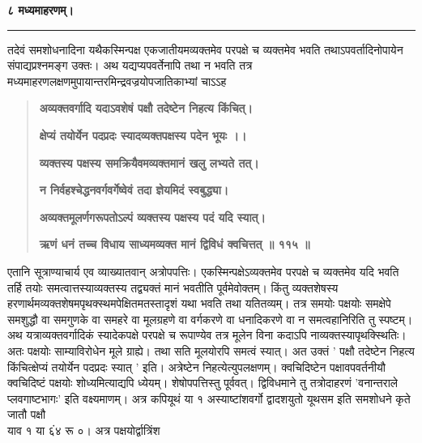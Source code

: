 \documentclass[11pt, openany]{book}
\begin{document}
\onehalfspacing
\begin{center}
\textbf{\large ८ मध्यमाहरणम्।}

\rule{0.1\linewidth}{0.5pt}
\end{center}

\begin{sloppypar}
\hangindent=0.2in \hspace{0.2in}तदेवं समशोधनादिना यथैकस्मिन्पक्ष एकजातीयमव्यक्तमेव परपक्षे च व्यक्तमेव भवति तथाऽपवर्तादिनोपायेन संपाद्यप्रश्नमङ्ग उक्तः। अथ यद्यप्यपवर्तेनापि तथा न भवति तत्र मध्यमाहरणलक्षणमुपायान्तरमिन्द्रवज्रयोपजातिकाभ्यां चाऽऽह\textendash

\begin{quote}
\hspace{0.5in}\textbf{अव्यक्तवर्गादि यदाऽवशेषं पक्षौ तदेष्टेन निहत्य किंचित्।}

\hspace{0.5in}\textbf{क्षेप्यं तयोर्येन पदप्रदः स्यादव्यक्तपक्षस्य पदेन भूयः ।।}

\hspace{0.5in}\textbf{व्यक्तस्य पक्षस्य समक्रियैवमव्यक्तमानं खलु लभ्यते तत्।}

\hspace{0.5in}\textbf{न निर्वहश्चेद्धनवर्गवर्गेष्वेवं तदा ज्ञेयमिदं स्वबुद्ध्या।}

\hspace{0.5in}\textbf{अव्यक्तमूलर्णगरूपतोऽल्पं व्यक्तस्य पक्षस्य पदं यदि स्यात्।}

\hspace{0.5in}\textbf{ऋणं धनं तच्च विधाय साध्यमव्यक्त मानं द्विविधं क्वचित्तत् ॥ ११५ ॥}
\end{quote}

\hangindent=0.2in \hspace{0.2in}एतानि सूत्राण्याचार्य एव व्याख्यातवान् अत्रोपपत्तिः। एकस्मिन्पक्षेऽव्यक्तमेव परपक्षे च व्यक्तमेव यदि भवति तर्हि तयोः समत्वात्तस्याव्यक्तस्य तद्व्यक्तं मानं भवतीति पूर्वमेवोक्तम्। किंतु व्यक्तशेषस्य हरणार्थमव्यक्तशेषमपृथक्स्थमपेक्षितमतस्तादृशं यथा भवति तथा यतितव्यम्। तत्र समयोः पक्षयोः समक्षेपे समशुद्धौ वा समगुणके वा समहरे वा मूलग्रहणे वा वर्गकरणे वा धनादिकरणे वा न समत्वहानिरिति तु स्पष्टम्। अथ यत्राव्यक्तवर्गादिकं स्यादेकपक्षे परपक्षे च रूपाण्येव तत्र मूलेन विना कदाऽपि नाव्यक्तस्यापृथक्स्थितिः। अतः पक्षयोः साम्याविरोधेन मूले ग्राह्ये। तथा सति मूलयोरपि समत्वं स्यात्। अत उक्तं ' पक्षौ तदेष्टेन निहत्य किंचित्क्षेप्यं तयोर्येन पदप्रदः स्यात् ' इति। अत्रेष्टेन निहत्येत्युपलक्षणम्। क्वचिदिष्टेन पक्षावपवर्तनीयौ क्वचिदिष्टं पक्षयोः शोध्यमित्याद्यपि ध्येयम्। शेषोपपत्तिस्तु पूर्ववत्। द्विविधमाने तु तत्रोदाहरणं 'वनान्तराले प्लवगाष्टभागः' इति वक्ष्यमाणम्। अत्र कपियूथं या १ अस्याष्टांशवर्गो द्वादशयुतो यूथसम इति समशोधने कृते जातौ पक्षौ \\याव १ या ६ं४ रू ०। अत्र पक्षयोर्द्वात्रिंश


\end{sloppypar}
\end{document}
